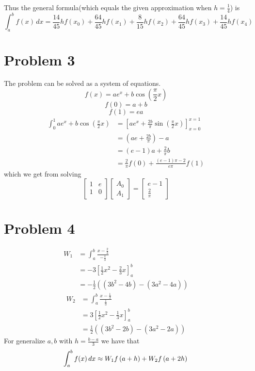 \documentclass{article}
\begin{document}
Thus the general formula(which equals the given approximation when $h=\frac{1}{4}$) is 
\[	
	\int_a^b f(x) \,dx= \frac{14}{45}hf(x_0) + \frac{64}{45}hf(x_1) + \frac{8}{15}hf(x_2) + \frac{64}{45}hf(x_3) + \frac{14}{45}hf(x_4)
\]
\newpage 

\section*{Problem 3}
The problem can be solved as a system of equations.
\[
	f(x) = ae^x + b\cos\left(\frac{\pi}{2}x\right)
\]
\[
	f(0) = a+b
\]
\[
	f(1) = ea
\]
\begin{align*}
	\int_0^1 ae^x + b\cos\left(\frac{\pi}{2}x\right) &= \left[ae^x + \frac{2b}{\pi}\sin\left(\frac{\pi}{2}x\right)\right]_{x=0}^{x=1} \\
    &= \left(ae + \frac{2b}{\pi}\right) - a \\
	&= (e-1)a + \frac{2}{\pi}b \\
	&= \frac{2}{\pi} f(0) + \frac{(e-1)\pi-2}{e\pi}f(1)
\end{align*}
which we get from solving 
\[	
	\begin{bmatrix}
		1 & e \\
		1 & 0 \\
	\end{bmatrix}
	\begin{bmatrix}
		A_0 \\ A_1
	\end{bmatrix} = 
	\begin{bmatrix}
		e-1 \\ \frac{2}{\pi}
	\end{bmatrix}
\]
\newpage 

\section*{Problem 4}
\begin{align*}
	W_1 &= \int_a^b \frac{x-\frac{2}{3}}{-\frac{1}{3}} \\
	&= -3 \left[\frac{1}{2}x^2 - \frac{2}{3}x\right]_a^b\\
	&=-\frac{1}{2}((3b^2-4b) - (3a^2-4a))
\end{align*}
\begin{align*}
	W_2 &= \int_a^b \frac{x-\frac{1}{3}}{\frac{1}{3}} \\
	&= 3 \left[\frac{1}{2}x^2 - \frac{1}{3}x\right]_a^b\\
	&=\frac{1}{2}((3b^2-2b) - (3a^2-2a))
\end{align*}
For generalize $a,b$ with $h= \frac{b-a}{3}$ we have that
\[
	\int_a^b f(x) \,dx \approx W_1f\left(a+h\right) + W_2f\left(a+2h\right)\\
\]
\end{document}
